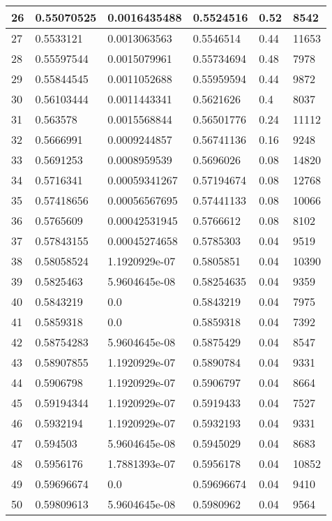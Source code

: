 \begin{longtable}{|l|l|l|l|l|l|}
26 & 0.55070525 & 0.0016435488 & 0.5524516 & 0.52 & 8542 \\ \hline 
27 & 0.5533121 & 0.0013063563 & 0.5546514 & 0.44 & 11653 \\ \hline 
28 & 0.55597544 & 0.0015079961 & 0.55734694 & 0.48 & 7978 \\ \hline 
29 & 0.55844545 & 0.0011052688 & 0.55959594 & 0.44 & 9872 \\ \hline 
30 & 0.56103444 & 0.0011443341 & 0.5621626 & 0.4 & 8037 \\ \hline 
31 & 0.563578 & 0.0015568844 & 0.56501776 & 0.24 & 11112 \\ \hline 
32 & 0.5666991 & 0.0009244857 & 0.56741136 & 0.16 & 9248 \\ \hline 
33 & 0.5691253 & 0.0008959539 & 0.5696026 & 0.08 & 14820 \\ \hline 
34 & 0.5716341 & 0.00059341267 & 0.57194674 & 0.08 & 12768 \\ \hline 
35 & 0.57418656 & 0.00056567695 & 0.57441133 & 0.08 & 10066 \\ \hline 
36 & 0.5765609 & 0.00042531945 & 0.5766612 & 0.08 & 8102 \\ \hline 
37 & 0.57843155 & 0.00045274658 & 0.5785303 & 0.04 & 9519 \\ \hline 
38 & 0.58058524 & 1.1920929e-07 & 0.5805851 & 0.04 & 10390 \\ \hline 
39 & 0.5825463 & 5.9604645e-08 & 0.58254635 & 0.04 & 9359 \\ \hline 
40 & 0.5843219 & 0.0 & 0.5843219 & 0.04 & 7975 \\ \hline 
41 & 0.5859318 & 0.0 & 0.5859318 & 0.04 & 7392 \\ \hline 
42 & 0.58754283 & 5.9604645e-08 & 0.5875429 & 0.04 & 8547 \\ \hline 
43 & 0.58907855 & 1.1920929e-07 & 0.5890784 & 0.04 & 9331 \\ \hline 
44 & 0.5906798 & 1.1920929e-07 & 0.5906797 & 0.04 & 8664 \\ \hline 
45 & 0.59194344 & 1.1920929e-07 & 0.5919433 & 0.04 & 7527 \\ \hline 
46 & 0.5932194 & 1.1920929e-07 & 0.5932193 & 0.04 & 9331 \\ \hline 
47 & 0.594503 & 5.9604645e-08 & 0.5945029 & 0.04 & 8683 \\ \hline 
48 & 0.5956176 & 1.7881393e-07 & 0.5956178 & 0.04 & 10852 \\ \hline 
49 & 0.59696674 & 0.0 & 0.59696674 & 0.04 & 9410 \\ \hline 
50 & 0.59809613 & 5.9604645e-08 & 0.5980962 & 0.04 & 9564 \\ \hline 

\end{longtable}
